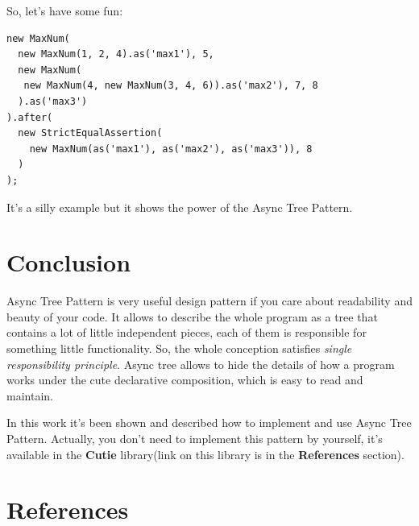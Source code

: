 \documentclass{article}
\begin{document}
So, let's have some fun:

\begin{lstlisting}
new MaxNum(
  new MaxNum(1, 2, 4).as('max1'), 5, 
  new MaxNum(
   new MaxNum(4, new MaxNum(3, 4, 6)).as('max2'), 7, 8
  ).as('max3')
).after(
  new StrictEqualAssertion(
    new MaxNum(as('max1'), as('max2'), as('max3')), 8 
  )
);
\end{lstlisting}

It's a silly example but it shows the power of the Async Tree Pattern.

\section{Conclusion}

Async Tree Pattern is very useful design pattern if you care about readability and beauty of your code. It allows to describe the whole program as a tree that contains a lot of little independent pieces, each of them is responsible for something little functionality. So, the whole conception satisfies \textit{single responsibility principle}. Async tree allows to hide the details of how a program works under the cute declarative composition, which is easy to read and maintain.

In this work it's been shown and described how to implement and use Async Tree Pattern. Actually, you don't need to implement this pattern by yourself, it's available in the \textbf{Cutie} library(link on this library is in the \textbf{References} section). 

\section{References}
\end{document}
